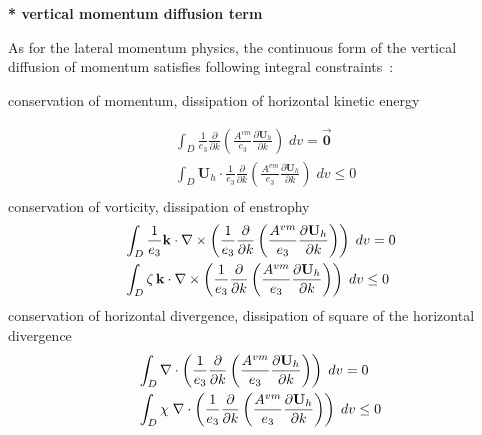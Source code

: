 \documentclass[../tex_main/NEMO_manual]{subfiles}
\begin{document}
\textbf{* vertical momentum diffusion term}

As for the lateral momentum physics, the continuous form of the vertical 
diffusion of momentum satisfies following integral constraints~:

conservation of momentum, dissipation of horizontal kinetic energy

\begin{equation} \label{eq:dynzdf_dyn}
\begin{aligned}
& \int_D {\frac{1}{e_3 }}  \frac{\partial }{\partial k}\left( \frac{A^{vm}}{e_3 }\frac{\partial {\textbf{U}}_h }{\partial k} \right) \;dv = \overrightarrow{\textbf{0}} \\ 
& \int_D \textbf{U}_h \cdot \frac{1}{e_3} \frac{\partial}{\partial k} \left( {\frac{A^{vm}}{e_3 }}{\frac{\partial \textbf{U}_h }{\partial k}} \right) \;dv \leq 0 \\ 
 \end{aligned} 
 \end{equation}
conservation of vorticity, dissipation of enstrophy
\begin{equation} \label{eq:dynzdf_vor}
\begin{aligned}
& \int_D {\frac{1}{e_3 }{\rm {\bf k}}\cdot \nabla \times \left( {\frac{1}{e_3 
}\frac{\partial }{\partial k}\left( {\frac{A^{vm}}{e_3 }\frac{\partial {\rm 
{\bf U}}_h }{\partial k}} \right)} \right)\;dv} =0 \\ 
& \int_D {\zeta \,{\rm {\bf k}}\cdot \nabla \times \left( {\frac{1}{e_3 
}\frac{\partial }{\partial k}\left( {\frac{A^{vm}}{e_3 }\frac{\partial {\rm 
{\bf U}}_h }{\partial k}} \right)} \right)\;dv} \leq 0 \\ 
\end{aligned}
\end{equation}
conservation of horizontal divergence, dissipation of square of the 
horizontal divergence
\begin{equation} \label{eq:dynzdf_div}
\begin{aligned}
 &\int_D {\nabla \cdot \left( {\frac{1}{e_3 }\frac{\partial }{\partial 
k}\left( {\frac{A^{vm}}{e_3 }\frac{\partial {\rm {\bf U}}_h }{\partial k}} 
\right)} \right)\;dv} =0 \\ 
& \int_D {\chi \;\nabla \cdot \left( {\frac{1}{e_3 }\frac{\partial }{\partial 
k}\left( {\frac{A^{vm}}{e_3 }\frac{\partial {\rm {\bf U}}_h }{\partial k}} 
\right)} \right)\;dv} \leq 0 \\ 
\end{aligned}
\end{equation}
\end{document}
